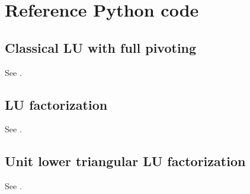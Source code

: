 \documentclass[final]{siamart1116}
\numberwithin{theorem}{section}
\begin{document}
\section{Reference Python code}

\subsection{Classical LU with full pivoting}\label{sec:python_full_pivoting}

See .



\subsection{LU factorization}\label{sec:python_restricted_pivoting}

See .



\subsection{Unit lower triangular LU factorization}\label{sec:python_unit_lower}

See .





\end{document}

